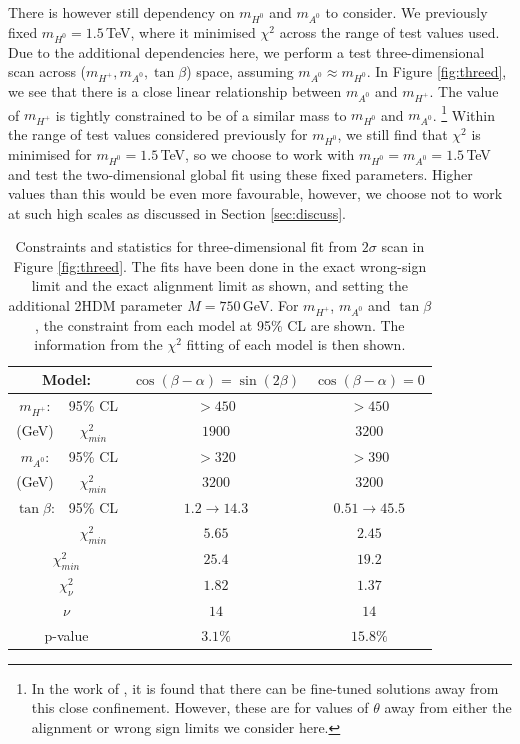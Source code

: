 \documentclass[a4paper,12pt]{article}
\begin{document}
There is however still dependency on $m_{H^0}$ and $m_{A^0}$ to consider.
We previously fixed $m_{H^0}=1.5\,$TeV, where it minimised $\chi^2$ across the range of test values used. 
Due to the additional dependencies here, we perform a test three-dimensional scan across ($m_{H^+},m_{A^0},\tan\beta$) space, assuming $m_{A^0}\approx m_{H^0}$.
In Figure \ref{fig:threed}, we see that there is a close linear relationship between $m_{A^0}$ and $m_{H^+}$. 
The value of $m_{H^+}$ is tightly constrained to be of a similar mass to $m_{H^0}$ and $m_{A^0}$. 
\hspace{-8pt}\footnote{In the work of \cite{james}, it is found that there can be fine-tuned solutions away from this close confinement. However, these are for values of $\theta$ away from either the alignment or wrong sign limits we consider here.}
\hspace{-3pt}Within the range of test values considered previously for $m_{H^0}$, we still find that $\chi^2$ is minimised for $m_{H^0}=1.5\,$TeV, so we choose to work with $m_{H^0}=m_{A^0}=1.5\,$TeV and test the two-dimensional global fit using these fixed parameters. 
Higher values than this would be even more favourable, however, we choose not to work at such high scales as discussed in Section \ref{sec:discuss}.
\begin{table}[ht]
    \centering
    \begin{tabular}{cc|c|c}
        \hline\hline
        \multicolumn{2}{c|}{\textbf{Model:}} & $\cos(\beta-\alpha)=\sin(2\beta)$ & $\cos(\beta-\alpha)=0$ \\ 
        \hline\hline
        $m_{H^+}$: & 95\% CL & $>450$ & $>450$ \\
        (GeV) & $\chi^2_{min}$ & $1900$ & $3200$ \\
        \hline
        $m_{A^0}$: & 95\% CL & $>320$ & $>390$ \\
        (GeV) & $\chi^2_{min}$ & $3200$ & $3200$ \\
        \hline
        $\tan\beta$: & 95\% CL & $1.2\to14.3$ & $0.51\to45.5$ \\
                     & $\chi^2_{min}$ & $5.65$ & $2.45$ \\
        \hline
        \multicolumn{2}{c|}{$\chi^2_{min}$} & $25.4$ & $19.2$ \\
        \multicolumn{2}{c|}{$\chi^2_\nu$} & $1.82$ & $1.37$ \\
        \multicolumn{2}{c|}{$\nu$} & $14$ & $14$ \\
        \multicolumn{2}{c|}{p-value} & $3.1\%$ & $15.8\%$ \\
        \hline\hline
    \end{tabular}
    \caption{\label{tab:pthreed}Constraints and statistics for three-dimensional fit from $2\sigma$ scan in Figure \ref{fig:threed}. 
    The fits have been done in the exact wrong-sign limit and the exact alignment limit as shown, and setting the additional 2HDM parameter $M=750\,$GeV. 
    For $m_{H^+}$, $m_{A^0}$ and $\tan\beta$, the constraint from each model at 95\% CL are shown.
    The information from the $\chi^2$ fitting of each model is then shown.}
    \vspace{-20pt}
\end{table}
\end{document}
